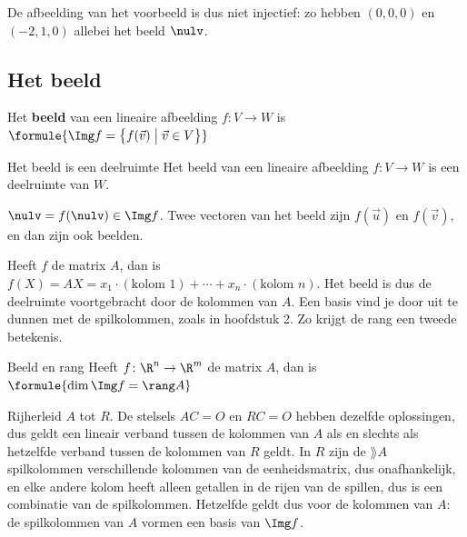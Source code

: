 De afbeelding van het voorbeeld is dus niet injectief: zo hebben $(0, 0, 0)$ en $(-2, 1, 0)$ allebei het beeld $\nulv$.

\begin{oefeningen}
\end{oefeningen}

\subsection{Het beeld}

\begin{theorie}
Het \textbf{\textcolor{accent}{beeld}} van een lineaire afbeelding $f \colon V \to W$ is \quad $\formule{\Img f = \bigl\{f(\vec v) \bigm| \vec v \in V\bigr\}}$

\begin{stelling}{Het beeld is een deelruimte}
Het beeld van een lineaire afbeelding $f \colon V \to W$ is een deelruimte van $W$.
\end{stelling}

\begin{bewijs}
$\nulv = f(\nulv) \in \Img f$. Twee vectoren van het beeld zijn $f(\vec u)$ en $f(\vec v)$, en dan zijn ook
beelden.
\end{bewijs}
\end{theorie}

Heeft $f$ de matrix $A$, dan is $f(X) = AX = x_1 \cdot (\text{kolom } 1) + \cdots + x_n \cdot (\text{kolom } n)$. Het beeld is dus de deelruimte voortgebracht door de kolommen van $A$. Een basis vind je door uit te dunnen met de spilkolommen, zoals in hoofdstuk 2. Zo krijgt de rang een tweede betekenis.

\begin{theorie}
\begin{stelling}{Beeld en rang}
Heeft $f \colon \R^n \to \R^m$ de matrix $A$, dan is \quad $\formule{\dim \Img f = \rang A}$
\end{stelling}

\begin{bewijs}
Rijherleid $A$ tot $R$. De stelsels $AC = O$ en $RC = O$ hebben dezelfde oplossingen, dus geldt een lineair verband tussen de kolommen van $A$ als en slechts als hetzelfde verband tussen de kolommen van $R$ geldt. In $R$ zijn de $\rang A$ spilkolommen verschillende kolommen van de eenheidsmatrix, dus onafhankelijk, en elke andere kolom heeft alleen getallen in de rijen van de spillen, dus is een combinatie van de spilkolommen. Hetzelfde geldt dus voor de kolommen van $A$: de spilkolommen van $A$ vormen een basis van $\Img f$.
\end{bewijs}
\end{theorie}

